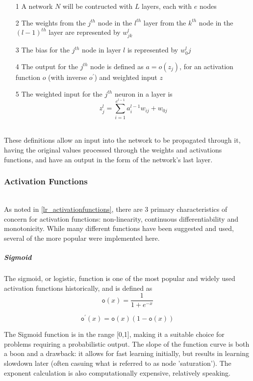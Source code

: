 \documentclass[a4paper,11pt,oneside]{article}
\theoremstyle{plain}
\theoremstyle{definition}
\begin{document}
\begin{itemize}
\item[1] A network $N$ will be contructed with $L$ layers, each with $e$ nodes
\item[2] The weights from the $j^{th}$ node in the $l^{th}$ layer from the $k^{th}$ node in the $(l-1)^{th}$ layer are represented by $w^l_{jk}$
\item[3] The bias for the $j^{th}$ node in layer $l$ is represented by $w^l_0j$
\item[4] The output for the $j^{th}$ node is defined as $a = o(z_j)$, for an activation function $o$ (with inverse $o^{\prime}$) and weighted input $z$
\item[5] The weighted input for the $j^{th}$ neuron in a layer is 
\begin{equation}\label{eq_weighted_input}
	z^l_j=\sum_{i=1}^{e^{l-1}}{a^{l-1}_iw_{ij}} + w_{0j}
\end{equation}
\end{itemize}
~\\
These definitions allow an input into the network to be propagated through it, having the original values processed through the weights and activations functions, and have an output in the form of the network's last layer.

\subsubsection{Activation Functions}\label{imp_activation_functions}
~\\
As noted in \ref{lr_activationfunctions}, there are 3 primary characteristics of concern for activation functions: non-linearity, continuous differentiability and monotonicity. While many different functions have been suggested and used, several of the more popular were implemented here.

\subparagraph{Sigmoid}

The sigmoid, or logistic, function is one of the most popular and widely used activation functions historically, and is defined as 
\begin{equation}\label{func_sigmoid}
\texttt{o}(x) = \frac{1}{1 + e^{-x}}
\end{equation}

\begin{equation}\label{func_sigmoidprime}
\texttt{o}^\prime(x) = \texttt{o}(x)(1-\texttt{o}(x))
\end{equation}

The Sigmoid function is in the range [0,1], making it a suitable choice for problems requiring a probabilistic output. The slope of the function curve is both a boon and a drawback: it allows for fast learning initially, but results in learning slowdown later (often casuing what is referred to as node 'saturation'). The exponent calculation is also computationally expensive, relatively speaking.
\end{document}

